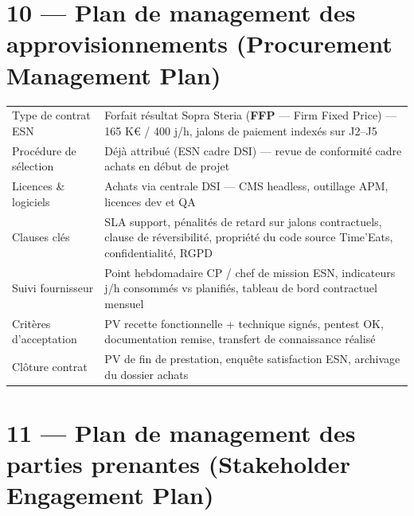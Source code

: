 \documentclass[11pt,a4paper,oneside]{report}
\begin{document}
\section*{10 — Plan de management des approvisionnements (Procurement Management Plan)}

\renewcommand{\arraystretch}{1.3}
\begin{tabularx}{\textwidth}{L{4cm} Y}
\toprule
{} &  \\
\midrule
Type de contrat ESN      & Forfait résultat Sopra Steria (\textbf{FFP} — Firm Fixed Price) — 165 K€ / 400 j/h, jalons de paiement indexés sur J2–J5 \\
Procédure de sélection   & Déjà attribué (ESN cadre DSI) — revue de conformité cadre achats en début de projet \\
Licences \& logiciels    & Achats via centrale DSI — CMS headless, outillage APM, licences dev et QA \\
Clauses clés             & SLA support, pénalités de retard sur jalons contractuels, clause de réversibilité, propriété du code source Time'Eats, confidentialité, RGPD \\
Suivi fournisseur        & Point hebdomadaire CP / chef de mission ESN, indicateurs j/h consommés vs planifiés, tableau de bord contractuel mensuel \\
Critères d'acceptation   & PV recette fonctionnelle + technique signés, pentest OK, documentation remise, transfert de connaissance réalisé \\
Clôture contrat          & PV de fin de prestation, enquête satisfaction ESN, archivage du dossier achats \\
\bottomrule
\end{tabularx}

\section*{11 — Plan de management des parties prenantes (Stakeholder Engagement Plan)}
\end{document}
